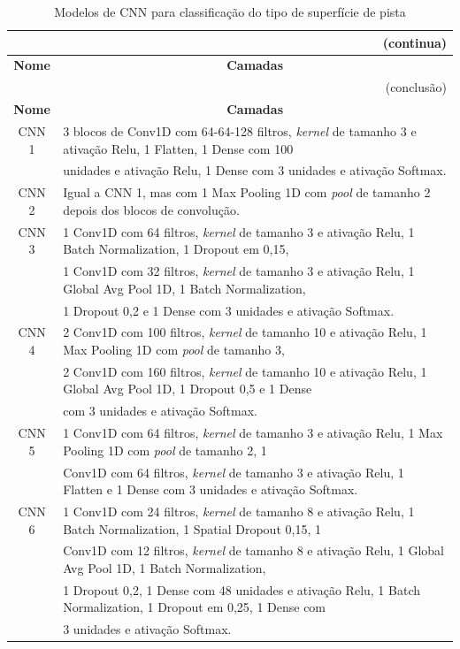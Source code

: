 \begin{center}
\scriptsize
\begin{longtable}{cl}
\caption{Modelos de CNN para classificação do tipo de superfície de pista} 
\label{table:cnn_superficie_pista_1}  \\
\multicolumn{2}{r}{(continua)} \\
\toprule \textbf{Nome} & \multicolumn{1}{c}{\textbf{Camadas}} \\ \midrule
\endfirsthead
\multicolumn{2}{r}{(conclusão)} \\
\toprule \textbf{Nome} & \multicolumn{1}{c}{\textbf{Camadas}} \\ \midrule
\endhead \endfoot \endlastfoot
CNN 1 &
3 blocos de Conv1D com 64-64-128 filtros, \textit{kernel} de tamanho 3 e ativação Relu, 1 Flatten, 1 Dense com 100 \\ & unidades e ativação Relu, 1 Dense com 3 unidades e ativação Softmax. \\ \midrule
CNN 2 & Igual a CNN 1, mas com 1 Max Pooling 1D com \textit{pool} de tamanho 2 depois dos blocos de convolução. \\ \midrule
CNN 3 & 1 Conv1D com 64 filtros,  \textit{kernel} de tamanho 3 e ativação Relu, 1 Batch Normalization, 1 Dropout em 0,15, \\ & 1 Conv1D com 32 filtros, \textit{kernel} de tamanho 3 e ativação Relu, 1 Global Avg Pool 1D, 1 Batch Normalization, \\ & 1 Dropout 0,2 e 1 Dense com 3 unidades e ativação Softmax.
 \\ \midrule
CNN 4 & 2 Conv1D com 100 filtros, \textit{kernel} de tamanho 10 e ativação Relu, 1 Max Pooling 1D com \textit{pool} de tamanho 3, \\ & 2 Conv1D com 160 filtros, \textit{kernel} de tamanho 10 e ativação Relu, 1 Global Avg Pool 1D, 1 Dropout 0,5 e 1 Dense \\ & com 3 unidades e ativação Softmax.
 \\ \midrule
CNN 5 & 1 Conv1D com 64 filtros, \textit{kernel} de tamanho 3 e ativação Relu, 1 Max Pooling 1D com \textit{pool} de tamanho 2, 1 \\ & Conv1D com 64 filtros, \textit{kernel} de tamanho 3 e ativação Relu, 1 Flatten e 1 Dense com 3 unidades e ativação Softmax.
 \\ \midrule
CNN 6 & 1 Conv1D com 24 filtros, \textit{kernel} de tamanho 8 e ativação Relu, 1 Batch Normalization, 1 Spatial Dropout 0,15, 1 \\ & Conv1D com 12 filtros, \textit{kernel} de tamanho 8 e ativação Relu, 1 Global Avg Pool 1D, 1 Batch Normalization, \\ & 1 Dropout 0,2, 1 Dense com 48 unidades e ativação Relu, 1 Batch Normalization, 1 Dropout em 0,25, 1 Dense com \\ & 3 unidades e ativação Softmax. \\ \midrule

\end{longtable}
\end{center}
